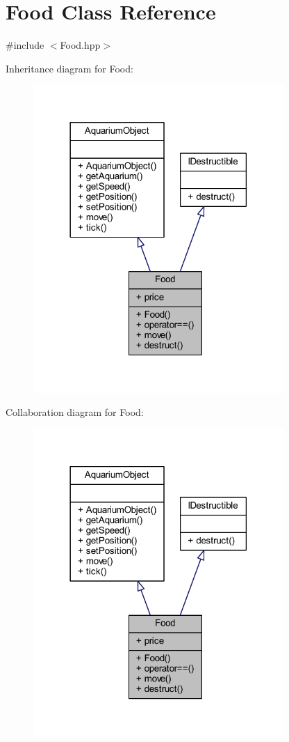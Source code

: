 \hypertarget{class_food}{}\section{Food Class Reference}
\label{class_food}


{\ttfamily \#include $<$Food.\+hpp$>$}



Inheritance diagram for Food\+:
\nopagebreak
\begin{figure}[H]
\begin{center}
\leavevmode
\includegraphics[width=270pt]{class_food__inherit__graph}
\end{center}
\end{figure}


Collaboration diagram for Food\+:
\nopagebreak
\begin{figure}[H]
\begin{center}
\leavevmode
\includegraphics[width=270pt]{class_food__coll__graph}
\end{center}
\end{figure}
